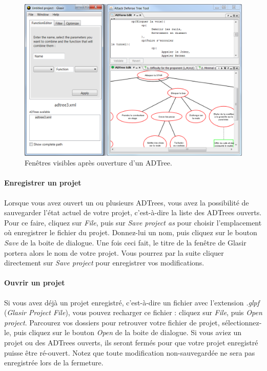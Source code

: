     \begin{figure}[!h]
        \centering
        \includegraphics[height=0.7\textwidth]{figure/glasirAditoule.png}
        \caption{Fenêtres visibles après ouverture d'un ADTree.}
        \label{fig:gladitoule}
    \end{figure}

\paragraph{Enregistrer un projet} Lorsque vous avez ouvert un ou plusieurs ADTrees, vous avez la possibilité de sauvegarder l'état actuel de votre projet, c'est-à-dire la liste des ADTrees ouverts. Pour ce faire, cliquez sur \emph{File}, puis sur \emph{Save project as} pour choisir l'emplacement où enregistrer le fichier du projet. Donnez-lui un nom, puis cliquez sur le bouton \emph{Save} de la boite de dialogue. Une fois ceci fait, le titre de la fenêtre de Glasir portera alors le nom de votre projet. Vous pourrez par la suite cliquer directement sur \emph{Save project} pour enregistrer vos modifications.

\paragraph{Ouvrir un projet} Si vous avez déjà un projet enregistré, c'est-à-dire un fichier avec l'extension \emph{.glpf} (\emph{Glasir Project File}), vous pouvez recharger ce fichier : cliquez sur \emph{File}, puis \emph{Open project}. Parcourez vos dossiers pour retrouver votre fichier de projet, sélectionnez-le, puis cliquez sur le bouton \emph{Open} de la boite de dialogue. Si vous aviez un projet ou des ADTrees ouverts, ils seront fermés pour que votre projet enregistré puisse être ré-ouvert. Notez que toute modification non-sauvegardée ne sera pas enregistrée lors de la fermeture.

